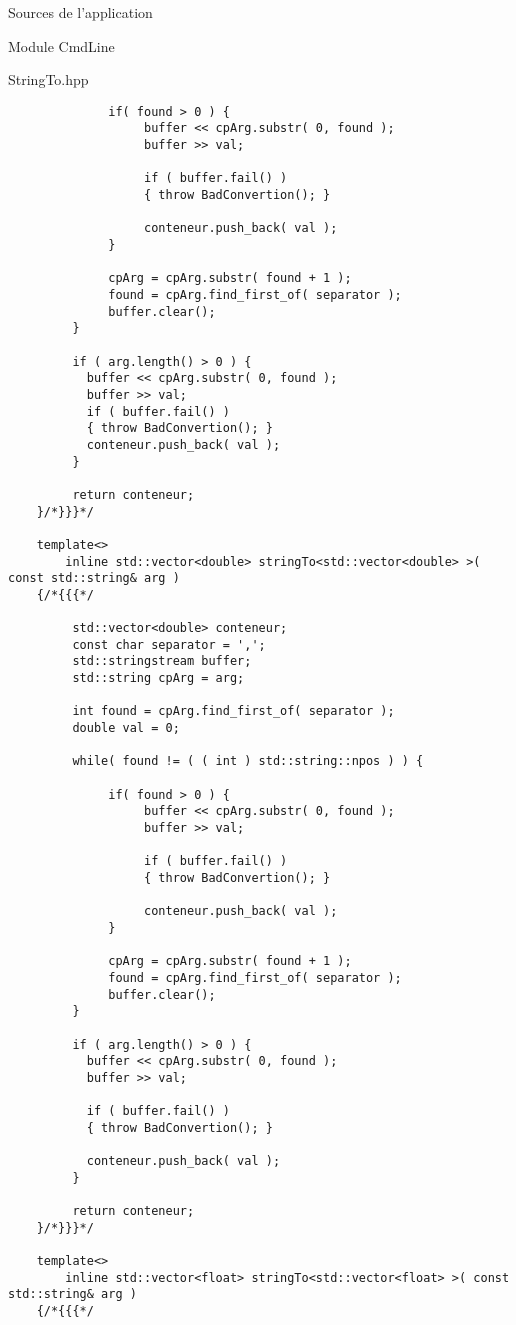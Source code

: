 \documentclass{article}
\begin{document}
\begin{section}{Sources de l'application}
\begin{subsection}{Module CmdLine}
\begin{paragraph}{StringTo.hpp}
\begin{verbatim}
              if( found > 0 ) {
                   buffer << cpArg.substr( 0, found );
                   buffer >> val;
                   
                   if ( buffer.fail() )
                   { throw BadConvertion(); }

                   conteneur.push_back( val );
              }

              cpArg = cpArg.substr( found + 1 );
              found = cpArg.find_first_of( separator );
              buffer.clear();
         }

         if ( arg.length() > 0 ) {
           buffer << cpArg.substr( 0, found );
           buffer >> val;
           if ( buffer.fail() )
           { throw BadConvertion(); }
           conteneur.push_back( val );
         }

         return conteneur;
    }/*}}}*/

    template<>
        inline std::vector<double> stringTo<std::vector<double> >( const std::string& arg )
    {/*{{{*/

         std::vector<double> conteneur;
         const char separator = ',';
         std::stringstream buffer;
         std::string cpArg = arg;

         int found = cpArg.find_first_of( separator );
         double val = 0;

         while( found != ( ( int ) std::string::npos ) ) {

              if( found > 0 ) {
                   buffer << cpArg.substr( 0, found );
                   buffer >> val;
                   
                   if ( buffer.fail() )
                   { throw BadConvertion(); }

                   conteneur.push_back( val );
              }

              cpArg = cpArg.substr( found + 1 );
              found = cpArg.find_first_of( separator );
              buffer.clear();
         }

         if ( arg.length() > 0 ) {
           buffer << cpArg.substr( 0, found );
           buffer >> val;

           if ( buffer.fail() )
           { throw BadConvertion(); }
           
           conteneur.push_back( val );
         }

         return conteneur;
    }/*}}}*/
    
    template<>
        inline std::vector<float> stringTo<std::vector<float> >( const std::string& arg )
    {/*{{{*/


\end{verbatim}
\end{paragraph}
\end{subsection}
\end{section}
\end{document}
